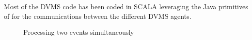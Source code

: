 Most of the DVMS code has been coded in SCALA leveraging the Java
primitives of \sg for the communications between the different DVMS agents.

\begin{figure}[t]
\vspace*{-.6cm}
%
%
%
%
\vspace*{-.3cm}
\caption{Processing two events simultaneously\label{fig:dvms_pte}}
\vspace*{-.6cm}
\end{figure}




